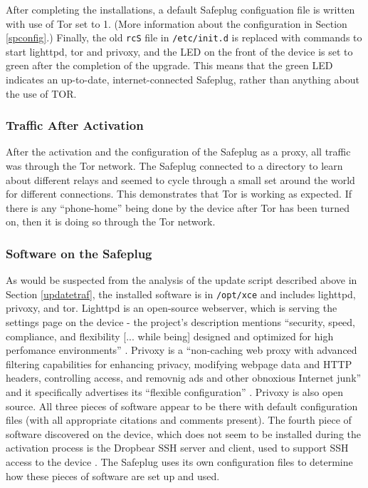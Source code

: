 After completing the installations, a default Safeplug configuation file is written with use of Tor set to 1.  (More information about the configuration in Section \ref{spconfig}.)  Finally, the old \verb!rcS! file in \verb!/etc/init.d! is replaced with commands to start lighttpd, tor and privoxy, and the LED on the front of the device is set to green after the completion of the upgrade. This means that the green LED indicates an up-to-date, internet-connected Safeplug, rather than anything about the use of TOR.

\subsubsection{Traffic After Activation}
After the activation and the configuration of the Safeplug as a proxy, all traffic was through the Tor network.  The Safeplug connected to a directory to learn about different relays and seemed to cycle through a small set around the world for different connections.  This demonstrates that Tor is working as expected.  If there is any ``phone-home'' being done by the device after Tor has been turned on, then it is doing so through the Tor network.


\subsubsection{Software on the Safeplug}
As would be suspected from the analysis of the update script described above in Section \ref{updatetraf}, the installed software is in \verb!/opt/xce! and includes lighttpd, privoxy, and tor.  Lighttpd is an open-source webserver, which is serving the settings page on the device - the project's description mentions ``security, speed, compliance, and flexibility [... while being] designed and optimized for high perfomance environments'' \cite{lighttpd}.  Privoxy is a ``non-caching web proxy with advanced filtering capabilities for enhancing privacy, modifying webpage data and HTTP headers, controlling access, and removnig ads and other obnoxious Internet junk'' and it specifically advertises its ``flexible configuration'' \cite{privoxy}.  Privoxy is also open source.  All three pieces of software appear to be there with default configuration files (with all appropriate citations and comments present).  The fourth piece of software discovered on the device, which does not seem to be installed during the activation process is the Dropbear SSH server and client, used to support SSH access to the device \cite{dropbear}.  The Safeplug uses its own configuration files to determine how these pieces of software are set up and used.
    
